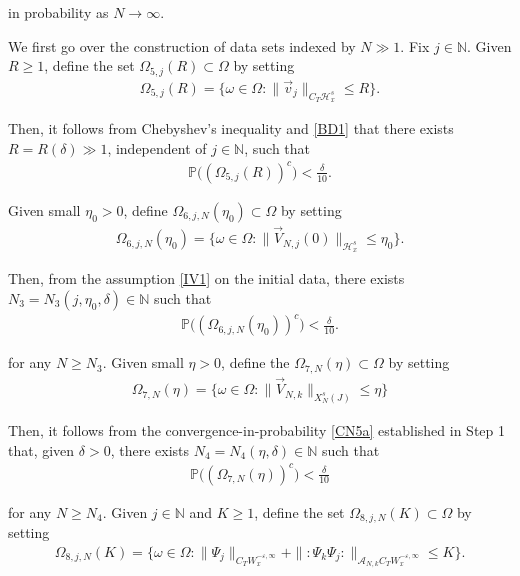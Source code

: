 \documentclass[letterpaper, 11pt,  reqno]{amsart}
\newcommand{\1}{\hspace{0.5mm}\text{I}\hspace{0.2mm}}
\newcommand{\noi}{\noindent}
\newcommand{\N}{\mathbb{N}}
\newcommand{\PP}{\mathbb{P}}
\renewcommand{\H}{\mathcal{H}}
\newcommand{\eps}{\varepsilon}
\newcommand{\dl}{\delta}
\newcommand{\A}{\mathcal{A}}
\newcommand{\wick}[1]{:\!{#1}\!:}
\renewcommand{\O}{\Omega}
\renewcommand{\o}{\omega}
\numberwithin{equation}{section}
\numberwithin{theorem}{section}
\begin{document}
\noi
in probability
as $N \to \infty$.


We first go over the construction of data sets indexed by $N \gg 1$.
Fix $j \in \N$.
\noi
Given  $R \ge 1$, define
the set $\O_{5, j} (R) \subset \O$
by setting
\begin{align}
\O_{5, j}(R) = \Big\{ \o \in \O: 
\| \vec v_j \|_{C_T\H^s_x}\le R\Big\}.
\label{DN1a}
\end{align}

\noi
Then, it follows from  Chebyshev's  inequality
and \eqref{BD1} that 
there exists $R = R(\dl) \gg1 $, independent of $j \in \N$,  such that 
\begin{align}
\PP\big( (\O_{5, j}(R))^c \big) < \frac \dl {10}.
\label{DN1b}
\end{align}



\noi
Given small $\eta_0 > 0$,  
define $\O_{6, j, N}(\eta_0)\subset \O$ by setting 
\begin{align}
\O_{6, j, N}(\eta_0)
= \Big\{ \o \in \O: 
\| \vec V_{N, j} (0)\|_{ \H^s_x} 
\le
\eta_0\Big\}.
\label{BDX0}
\end{align}


\noi
Then, from 
the assumption \eqref{IV1} on the initial data, 
there exists  $N_3 = N_3(j, \eta_0, \dl) \in \N$ such that
\begin{align}
\PP\big( (\O_{6, j, N}(\eta_0))^c \big) < \frac \dl {10}.
\label{DN1c}
\end{align}



\noi
for any $N \ge N_3$.
Given small $\eta > 0$, 
define the $\O_{7, N}(\eta)\subset \O$
by setting
\begin{align}
\O_{7, N} (\eta)= \Big\{\o \in \O: \| \vec V_{N, k}\|_{X^s_{N}(J)} \le \eta\Big\}
\label{BDX3}
\end{align}

\noi
Then, it follows 
from the convergence-in-probability \eqref{CN5a}
established in 
Step 1 that, given $\dl > 0$, 
there exists $N_4 = N_4(\eta, \dl) \in \N$ such that 
\begin{align}
\PP\big( (\O_{7, N}(\eta))^c \big) < \frac \dl {10}
\label{BDX4}
\end{align}

\noi
for any $N \ge N_4$.
Given $j \in \N$ and $K \ge 1 $, define the set $\O_{8, j, N}(K) \subset \O$ by setting 
\begin{align}
\O_{8, j, N}(K) = \Big\{ \o \in \O: 
 \| \Psi_j \|_{C_T W^{-\eps, \infty}_x} 
 + 
 \| \wick{\Psi_k\Psi_j} \|_{\A_{N, k}C_T W^{-\eps, \infty}_x}  \le K\Big\}.
\label{BDX5}
\end{align}
\end{document}
